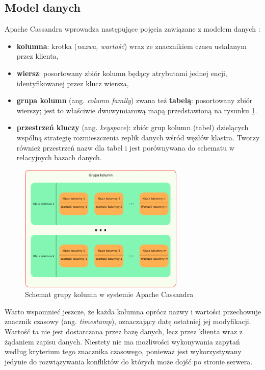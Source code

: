\subsection{Model danych}

Apache Cassandra wprowadza następujące pojęcia zawiązane z modelem danych \cite{cassandraArchitecture}:
\begin{itemize}
    \item \textbf{kolumna}: krotka (\textit{nazwa, wartość}) wraz ze znacznikiem czasu ustalanym przez klienta,
    \item \textbf{wiersz}: posortowany zbiór kolumn będący atrybutami jednej encji, identyfikowanej przez klucz wiersza,
    \item \textbf{grupa kolumn} (ang. \textit{column family}) zwana też \textbf{tabelą}: posortowany zbiór wierszy; jest to właściwie dwuwymiarową mapą przedstawioną na rysunku \ref{fig:cassandraColumnFamily}.
    \item \textbf{przestrzeń kluczy} (ang. \textit{keyspace}): zbiór grup kolumn (tabel) dzielących wspólną strategię rozmieszczenia replik danych wśród węzłów klastra. Tworzy również przestrzeń nazw dla tabel i jest porównywana do schematu w relacyjnych bazach danych.
\end{itemize}

\begin{figure}[!ht]
\centering
\includegraphics[width=0.7\textwidth]{figures/casModel1.png}
\caption{Schemat grupy kolumn w systemie Apache Cassandra}
\label{fig:cassandraColumnFamily}
\end{figure}

Warto wspomnieć jeszcze, że każda kolumna oprócz nazwy i wartości przechowuje znacznik czasowy (ang. \textit{timestamp}), oznaczający datę ostatniej jej modyfikacji.
Wartość ta nie jest dostarczana przez bazę danych, lecz przez klienta wraz z żądaniem zapisu danych.
Niestety nie ma możliwości wykonywania zapytań według kryterium tego znacznika czasowego, ponieważ jest wykorzystywany jedynie do rozwiązywania konfliktów do których może dojść po stronie serwera.

